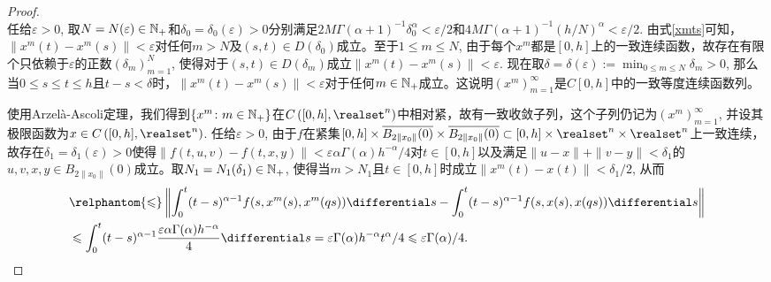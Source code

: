 \begin{proof}
\begin{equation}
    \end{equation}
    任给$\varepsilon>0$, 取$N=N(\varepsilon)\in \mathbb{N_+}$和$\delta_0=\delta_0(\varepsilon)>0$分别满足$2M\Gamma(\alpha+1)^{-1}\delta_0^\alpha < \varepsilon/2$和$4M\Gamma(\alpha+1)^{-1}(h/N)^\alpha<\varepsilon/2$. 由式\eqref{xmts}可知，$\left\| x^m(t)-x^m(s) \right\| < \varepsilon$对任何$m>N$及$(s,t)\in D(\delta_0)$成立。至于$1\leqslant m\leqslant N$, 由于每个$x^m$都是$[0,h]$上的一致连续函数，故存在有限个只依赖于$\varepsilon$的正数$\left(\delta_m\right)_{m=1}^N$, 使得对于$(s,t)\in D(\delta_m)$成立$\left\| x^m(t)-x^m(s) \right\| < \varepsilon$. 现在取$\delta=\delta(\varepsilon):=\min_{0\leqslant m\leqslant N} \delta_m>0$, 那么当$0\leqslant s\leqslant t \leqslant h$且$t-s<\delta$时，$\left\| x^m(t)-x^m(s) \right\| < \varepsilon$对于任何$m\in \mathbb{N_+}$成立。这说明$\left(x^m\right)_{m=1}^\infty$是$C[0,h]$中的一致等度连续函数列。

    使用Arzel\`a-Ascoli定理，我们得到$\left\{x^m\colon m\in \mathbb{N_+}\right\}$在$C\left([0,h],\realset^n\right)$中相对紧，故有一致收敛子列，这个子列仍记为$\left(x^m\right)_{m=1}^\infty$, 并设其极限函数为$x\in C\left([0,h],\realset^n\right)$. 任给$\varepsilon>0$, 由于$f$在紧集$[0,h]\times \overline{B_{2\|x_0\|}(0)}\times \overline{B_{2\|x_0\|}(0)}\subset [0,h]\times \realset^n\times \realset^n$上一致连续，故存在$\delta_1=\delta_1(\varepsilon)>0$使得$\|f(t,u,v)-f(t,x,y)\|<\varepsilon \alpha \Gamma(\alpha) h^{-\alpha} / 4$对$t\in [0,h]$以及满足$\|u-x\|+\|v-y\|<\delta_1$的$u,v,x,y\in B_{2\|x_0\|}(0)$成立。取$N_1=N_1(\delta_1)\in \mathbb{N_+}$, 使得当$m>N_1$且$t\in [0,h]$时成立$\left\|x^m(t)-x(t)\right\|<\delta_1/2$, 从而
    \begin{equation}\label{xmx}
        \begin{aligned}
            &\relphantom{\leqslant}\left\|\int_{0}^{t}(t-s)^{\alpha-1}f(s,x^m(s),x^m(qs))\differential s - \int_{0}^{t}(t-s)^{\alpha-1}f(s,x(s),x(qs))\differential s\right\|
            \\ &\leqslant \int_{0}^{t}(t-s)^{\alpha-1} \frac{\varepsilon \alpha \Gamma(\alpha) h^{-\alpha}}{4} \differential s=\varepsilon \Gamma(\alpha) h^{-\alpha} t^\alpha / 4 \leqslant \varepsilon\Gamma(\alpha)/4.
        \end{aligned}
    \end{equation}


\end{proof}
